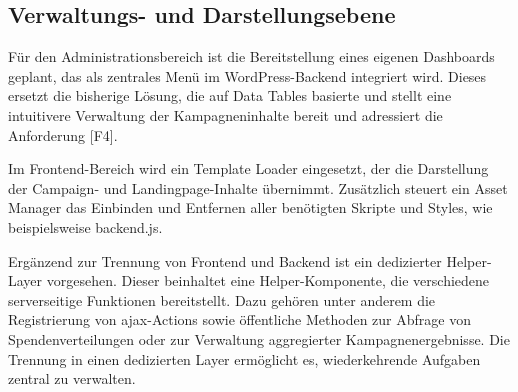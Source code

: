 \subsection{Verwaltungs- und Darstellungsebene}
Für den Administrationsbereich ist die Bereitstellung eines eigenen Dashboards geplant, das als zentrales Menü im WordPress-Backend integriert wird.
Dieses ersetzt die bisherige Lösung, die auf Data Tables basierte und stellt eine intuitivere Verwaltung der Kampagneninhalte bereit und adressiert die Anforderung [F4].

Im Frontend-Bereich wird ein Template Loader eingesetzt, der die Darstellung der Campaign- und Landingpage-Inhalte übernimmt.
Zusätzlich steuert ein Asset Manager das Einbinden und Entfernen aller benötigten Skripte und Styles, wie beispielsweise backend.js.

Ergänzend zur Trennung von Frontend und Backend ist ein dedizierter Helper-Layer vorgesehen.
Dieser beinhaltet eine Helper-Komponente, die verschiedene serverseitige Funktionen bereitstellt.
Dazu gehören unter anderem die Registrierung von \gls{ajax}-Actions sowie öffentliche Methoden zur Abfrage von Spendenverteilungen oder zur Verwaltung aggregierter Kampagnenergebnisse.
Die Trennung in einen dedizierten Layer ermöglicht es, wiederkehrende Aufgaben zentral zu verwalten.


%
